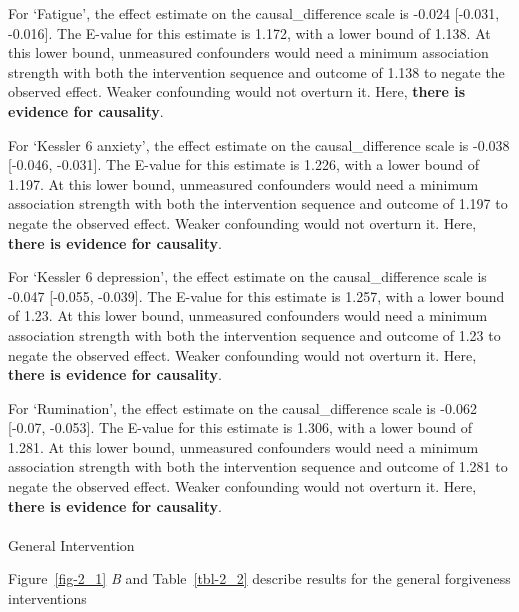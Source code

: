 \documentclass[
  single column]{article}
\makeatletter
\let\oldparagraph\paragraph
\renewcommand{\paragraph}{
    \@ifstar
      \xxxParagraphStar
      \xxxParagraphNoStar
  }
\newcommand{\xxxParagraphStar}[1]{\oldparagraph*{#1}\mbox{}}
\newcommand{\xxxParagraphNoStar}[1]{\oldparagraph{#1}\mbox{}}
\makeatother
\begin{document}
For `Fatigue', the effect estimate on the causal\_difference scale is
-0.024 {[}-0.031, -0.016{]}. The E-value for this estimate is 1.172,
with a lower bound of 1.138. At this lower bound, unmeasured confounders
would need a minimum association strength with both the intervention
sequence and outcome of 1.138 to negate the observed effect. Weaker
confounding would not overturn it. Here, \textbf{there is evidence for
causality}.

For `Kessler 6 anxiety', the effect estimate on the causal\_difference
scale is -0.038 {[}-0.046, -0.031{]}. The E-value for this estimate is
1.226, with a lower bound of 1.197. At this lower bound, unmeasured
confounders would need a minimum association strength with both the
intervention sequence and outcome of 1.197 to negate the observed
effect. Weaker confounding would not overturn it. Here, \textbf{there is
evidence for causality}.

For `Kessler 6 depression', the effect estimate on the
causal\_difference scale is -0.047 {[}-0.055, -0.039{]}. The E-value for
this estimate is 1.257, with a lower bound of 1.23. At this lower bound,
unmeasured confounders would need a minimum association strength with
both the intervention sequence and outcome of 1.23 to negate the
observed effect. Weaker confounding would not overturn it. Here,
\textbf{there is evidence for causality}.

For `Rumination', the effect estimate on the causal\_difference scale is
-0.062 {[}-0.07, -0.053{]}. The E-value for this estimate is 1.306, with
a lower bound of 1.281. At this lower bound, unmeasured confounders
would need a minimum association strength with both the intervention
sequence and outcome of 1.281 to negate the observed effect. Weaker
confounding would not overturn it. Here, \textbf{there is evidence for
causality}.

\paragraph{General Intervention}\label{general-intervention-1}

Figure~\ref{fig-2_1} \emph{B} and Table~\ref{tbl-2_2} describe results
for the general forgiveness interventions
\end{document}

